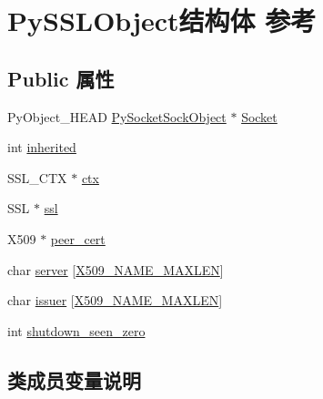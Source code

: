 \hypertarget{struct_py_s_s_l_object}{}\section{Py\+S\+S\+L\+Object结构体 参考}
\label{struct_py_s_s_l_object}
\subsection*{Public 属性}
\begin{DoxyCompactItemize}
\item 
Py\+Object\+\_\+\+H\+E\+AD \mbox{\hyperlink{struct_py_socket_sock_object}{Py\+Socket\+Sock\+Object}} $\ast$ \mbox{\hyperlink{struct_py_s_s_l_object_a948a0afd2a01335f7ae8dcb6dc98726e}{Socket}}
\item 
int \mbox{\hyperlink{struct_py_s_s_l_object_a203ece013fb193c2193084c474b05718}{inherited}}
\item 
S\+S\+L\+\_\+\+C\+TX $\ast$ \mbox{\hyperlink{struct_py_s_s_l_object_a5a1cc38e66321a91bbefb8aa04210d23}{ctx}}
\item 
S\+SL $\ast$ \mbox{\hyperlink{struct_py_s_s_l_object_af35f6b49091e1a90e3280ec946848465}{ssl}}
\item 
X509 $\ast$ \mbox{\hyperlink{struct_py_s_s_l_object_a20cf34a327072acd97c4fb67461cb8df}{peer\+\_\+cert}}
\item 
char \mbox{\hyperlink{struct_py_s_s_l_object_a9a607aecd61eddf70fea788df8e527e9}{server}} \mbox{[}\mbox{\hyperlink{__ssl_8c_add7e443d6278e58a08d1e1449113d943}{X509\+\_\+\+N\+A\+M\+E\+\_\+\+M\+A\+X\+L\+EN}}\mbox{]}
\item 
char \mbox{\hyperlink{struct_py_s_s_l_object_ab84269ce53ac97c406bcebbf663f2512}{issuer}} \mbox{[}\mbox{\hyperlink{__ssl_8c_add7e443d6278e58a08d1e1449113d943}{X509\+\_\+\+N\+A\+M\+E\+\_\+\+M\+A\+X\+L\+EN}}\mbox{]}
\item 
int \mbox{\hyperlink{struct_py_s_s_l_object_a111e5342b756d12b215e23c763b1d67c}{shutdown\+\_\+seen\+\_\+zero}}
\end{DoxyCompactItemize}


\subsection{类成员变量说明}
\mbox{\label{struct_py_s_s_l_object_a5a1cc38e66321a91bbefb8aa04210d23}} 
